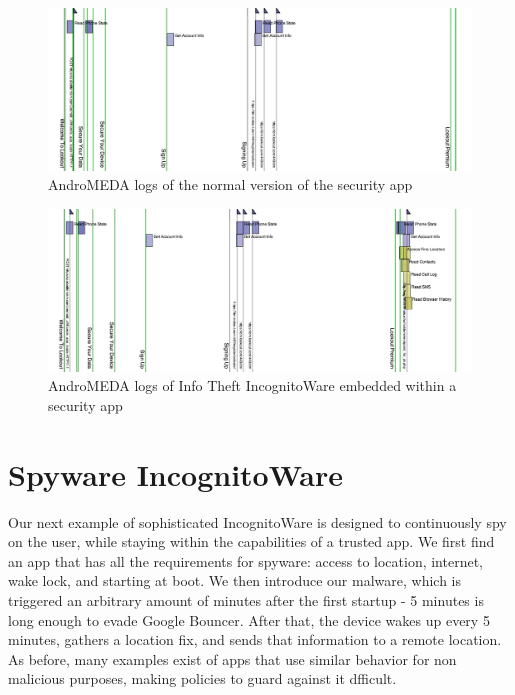 \begin{figure}[h]
\begin{center}
\includegraphics[width=1.0\columnwidth]{figs/AndroMEDA_Lookout_Notmalware}
\caption{AndroMEDA logs of the normal version of the security app }
\label{fig:infotheft_logs_nonmalware}
\end{center}
\end{figure}

\begin{figure}[h]
\begin{center}
\includegraphics[width=1.0\columnwidth]{figs/AndroMEDA_Lookout_Malware}
\caption{AndroMEDA logs of Info Theft IncognitoWare embedded within a security app }
\label{fig:infotheft_logs_malware}
\end{center}
\end{figure}




\section{Spyware IncognitoWare}
Our next example of sophisticated IncognitoWare is designed to continuously spy on the user, while staying within the capabilities of a trusted app. We first find an app that has all the requirements for spyware: access to location, internet, wake lock, and starting at boot. We then introduce our malware, which is triggered an arbitrary amount of minutes after the first startup - 5 minutes is long enough to evade Google Bouncer\citep{mansfield2012android}. After that, the device wakes up every 5 minutes, gathers a location fix, and sends that information to a remote location. As before, many examples exist of apps that use similar behavior for non malicious purposes, making policies to guard against it dfficult.

